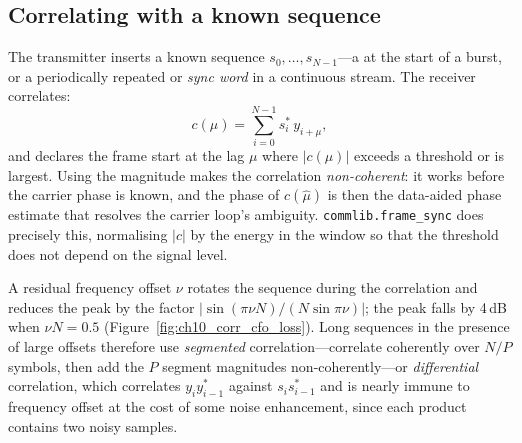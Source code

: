 
\subsection{Correlating with a known sequence}

The transmitter inserts a known sequence $s_0,\dots,s_{N-1}$---a  at the start of a burst,
or a periodically repeated  or \emph{sync word} in a continuous stream. The receiver
correlates:
\begin{equation}
c(\mu)=\sum_{i=0}^{N-1}s_i^*\,y_{i+\mu},
\end{equation}
and declares the frame start at the lag $\mu$ where $|c(\mu)|$ exceeds a threshold or is largest. Using
the magnitude makes the correlation \emph{non-coherent}: it works before the carrier phase is known,
and the phase of $c(\hat\mu)$ is then the data-aided phase estimate that resolves the carrier loop's
ambiguity. \texttt{commlib.frame\_sync} does precisely this, normalising $|c|$ by the energy in the
window so that the threshold does not depend on the signal level.

A residual frequency offset $\nu$ rotates the sequence during the correlation and reduces the peak
by the factor $|\sin(\pi\nu N)/(N\sin\pi\nu)|$; the peak falls by 4\,dB when $\nu N=0.5$
(Figure~\ref{fig:ch10_corr_cfo_loss}). Long sequences in the presence of large offsets therefore use
\emph{segmented} correlation---correlate coherently over $N/P$ symbols, then add the $P$ segment
magnitudes non-coherently---or \emph{differential} correlation, which correlates $y_{i}y_{i-1}^*$
against $s_is_{i-1}^*$ and is nearly immune to frequency offset at the cost of some noise
enhancement, since each product contains two noisy samples.


